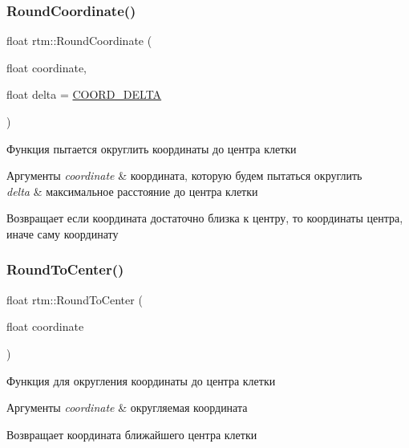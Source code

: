 \subsubsection{\texorpdfstring{Round\+Coordinate()}{RoundCoordinate()}}
{\footnotesize\ttfamily float rtm\+::\+Round\+Coordinate (\begin{DoxyParamCaption}\item[{float}]{coordinate,  }\item[{float}]{delta = {\ttfamily \hyperlink{namespacertm_a9ae158a8873bdf59aa9872cdada6c657}{C\+O\+O\+R\+D\+\_\+\+D\+E\+L\+TA}} }\end{DoxyParamCaption})}

Функция пытается округлить координаты до центра клетки 
\begin{DoxyParams}{Аргументы}
{\em coordinate} & координата, которую будем пытаться округлить \\
\hline
{\em delta} & максимальное расстояние до центра клетки \\
\hline
\end{DoxyParams}
\begin{DoxyReturn}{Возвращает}
если координата достаточно близка к центру, то координаты центра, иначе саму координату 
\end{DoxyReturn}
\mbox{\label{namespacertm_aa2d382c50aa6366b09deaa529d1b3199}} 
\subsubsection{\texorpdfstring{Round\+To\+Center()}{RoundToCenter()}}
{\footnotesize\ttfamily float rtm\+::\+Round\+To\+Center (\begin{DoxyParamCaption}\item[{float}]{coordinate }\end{DoxyParamCaption})}

Функция для округления координаты до центра клетки 
\begin{DoxyParams}{Аргументы}
{\em coordinate} & округляемая координата \\
\hline
\end{DoxyParams}
\begin{DoxyReturn}{Возвращает}
координата ближайшего центра клетки 
\end{DoxyReturn}
\mbox{\label{namespacertm_a030416c27fb4a5896aad3d102083897f}} 
